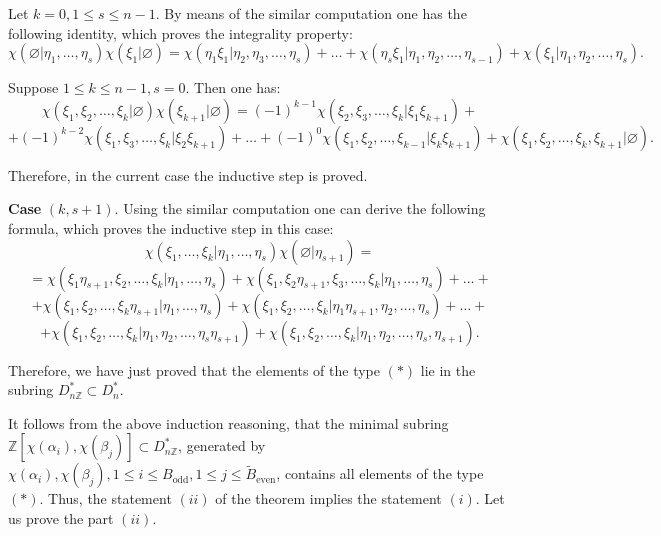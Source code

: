 \documentclass[a4paper,14pt]{article}
\newcommand{\odd}{\mathrm{odd}}
\newcommand{\even}{\mathrm{even}}
\newcommand{\Z}{\mathbb{Z}}
\begin{document}
Let $k=0, 1\le s\le n-1$. By means of the similar computation one has the following identity, which proves the integrality property:
$$
\chi(\varnothing | \eta_1,\ldots,\eta_s)\chi(\xi_1 | \varnothing) =  \chi(\eta_1\xi_1 |  \eta_2, \eta_3,\ldots,\eta_s) + \ldots + \chi(\eta_s\xi_1 |  \eta_1, \eta_2,\ldots,\eta_{s-1})  +  \chi(\xi_1 | \eta_1,\eta_2,\ldots, \eta_s).
$$

Suppose $1\le k\le n-1, s=0$. Then one has:
$$
\chi(\xi_1,\xi_2,\ldots,\xi_k | \varnothing) \chi(\xi_{k+1} | \varnothing)  =  (-1)^{k-1}\chi(\xi_2,\xi_3,\ldots,\xi_k | \xi_1\xi_{k+1}) +  
$$
$$
+ (-1)^{k-2}\chi(\xi_1,\xi_3,\ldots,\xi_k | \xi_2\xi_{k+1})  + \ldots + (-1)^0 \chi(\xi_1,\xi_2,\ldots,\xi_{k-1} | \xi_k\xi_{k+1}) + \chi(\xi_1,\xi_2,\ldots,\xi_k,\xi_{k+1} | \varnothing ). 
$$

Therefore, in the current case the inductive step is proved. 


\textbf{Case} $(k,s+1)$. Using the similar computation one can derive the following formula, which proves the inductive step in this case: 
$$
\chi(\xi_1,\ldots,\xi_k | \eta_1,\ldots,\eta_s) \chi( \varnothing | \eta_{s+1})    = 
$$
$$
=  \chi(\xi_1 \eta_{s+1},\xi_2,\ldots,\xi_k  |  \eta_1,\ldots,\eta_s) + \chi(\xi_1 ,\xi_2\eta_{s+1},\xi_3,\ldots,\xi_k  |  \eta_1,\ldots,\eta_s)  + \ldots +
$$
$$
+  \chi(\xi_1,\xi_2,\ldots,\xi_k\eta_{s+1}  |  \eta_1,\ldots,\eta_s) + \chi(\xi_1,\xi_2,\ldots,\xi_k  |  \eta_1\eta_{s+1},\eta_2,\ldots,\eta_s) + \ldots +
$$
$$
+  \chi(\xi_1,\xi_2,\ldots,\xi_k  |  \eta_1,\eta_2,\ldots,\eta_s\eta_{s+1}) +  \chi(\xi_1,\xi_2,\ldots,\xi_k  |  \eta_1,\eta_2,\ldots,\eta_s,\eta_{s+1}).
$$

Therefore, we have just proved that the elements of the type $(*)$ lie in the subring $D^*_{n\Z}\subset D^*_n$.

It follows from the above induction reasoning, that the minimal subring $\Z[\chi(\alpha_i),\chi(\beta_j)]\subset D^*_{n\Z}$, generated by $\chi(\alpha_i),\chi(\beta_j), 1\le i\le B_{\odd}, 1\le j\le \tilde{B}_{\even}$, contains all elements of the type $(*)$. Thus, the statement $(ii)$ of the theorem implies the statement $(i)$. Let us prove the part $(ii)$. 
\end{document}
